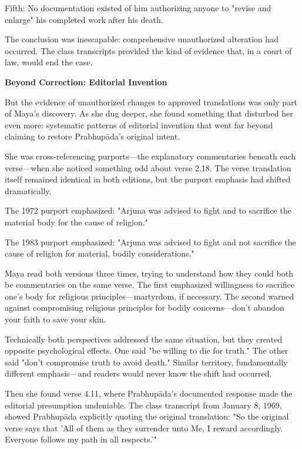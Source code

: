 \documentclass[12pt,twoside]{book}
\begin{document}
Fifth: No documentation existed of him authorizing anyone to "revise and enlarge" his completed work after his death.

The conclusion was inescapable: comprehensive unauthorized alteration had occurred. The class transcripts provided the kind of evidence that, in a court of law, would end the case.



\vspace{0.5cm}
\textbf{Beyond Correction: Editorial Invention}
\vspace{0.2cm}


But the evidence of unauthorized changes to approved translations was only part of Maya's discovery. As she dug deeper, she found something that disturbed her even more: systematic patterns of editorial invention that went far beyond claiming to restore Prabhupāda's original intent.

She was cross-referencing purports—the explanatory commentaries beneath each verse—when she noticed something odd about verse 2.18. The verse translation itself remained identical in both editions, but the purport emphasis had shifted dramatically.

The 1972 purport emphasized: "Arjuna was advised to fight and to sacrifice the material body for the cause of religion."

The 1983 purport emphasized: "Arjuna was advised to fight and not sacrifice the cause of religion for material, bodily considerations."

Maya read both versions three times, trying to understand how they could both be commentaries on the same verse. The first emphasized willingness to sacrifice one's body for religious principles—martyrdom, if necessary. The second warned against compromising religious principles for bodily concerns—don't abandon your faith to save your skin.

Technically both perspectives addressed the same situation, but they created opposite psychological effects. One said "be willing to die for truth." The other said "don't compromise truth to avoid death." Similar territory, fundamentally different emphasis—and readers would never know the shift had occurred.

Then she found verse 4.11, where Prabhupāda's documented response made the editorial presumption undeniable. The class transcript from January 8, 1969, showed Prabhupāda explicitly quoting the original translation: "So the original verse says that 'All of them as they surrender unto Me, I reward accordingly. Everyone follows my path in all respects.'"
\end{document}
